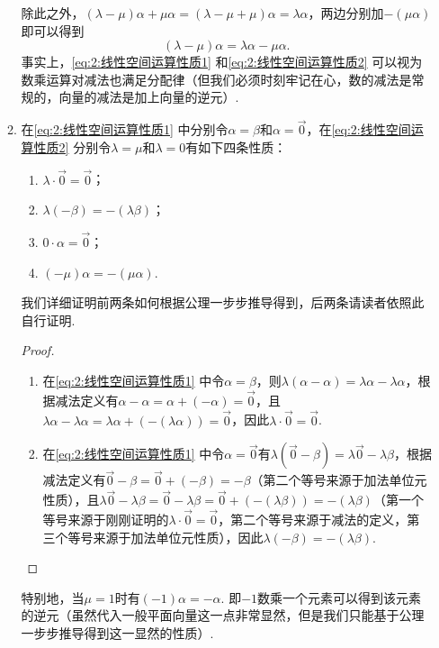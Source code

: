 \begin{enumerate}
\begin{enumerate}
                    除此之外，$(\lambda-\mu)\alpha+\mu\alpha=(\lambda-\mu+\mu)\alpha=\lambda\alpha$，两边分别加$-(\mu\alpha)$即可以得到
                    \begin{equation}\label{eq:2:线性空间运算性质2}
                        (\lambda-\mu)\alpha=\lambda\alpha-\mu\alpha.
                    \end{equation}
                    事实上，\autoref{eq:2:线性空间运算性质1} 和\autoref{eq:2:线性空间运算性质2} 可以视为数乘运算对减法也满足分配律（但我们必须时刻牢记在心，数的减法是常规的，向量的减法是加上向量的逆元）.

              \item 在\autoref{eq:2:线性空间运算性质1} 中分别令$\alpha=\beta$和$\alpha=\vec{0}$，在\autoref{eq:2:线性空间运算性质2} 分别令$\lambda=\mu$和$\lambda=0$有如下四条性质：
                    \begin{enumerate}
                        \item $\lambda\cdot \vec{0}=\vec{0}$；

                        \item $\lambda(-\beta)=-(\lambda\beta)$；

                        \item $0\cdot \alpha=\vec{0}$；

                        \item $(-\mu)\alpha=-(\mu\alpha)$.
                    \end{enumerate}
                    我们详细证明前两条如何根据公理一步步推导得到，后两条请读者依照此自行证明.
                    \begin{proof}
                        \begin{enumerate}
                            \item 在\autoref{eq:2:线性空间运算性质1} 中令$\alpha=\beta$，则$\lambda(\alpha-\alpha)=\lambda\alpha-\lambda\alpha$，根据减法定义有$\alpha-\alpha=\alpha+(-\alpha)=\vec{0}$，且$\lambda\alpha-\lambda\alpha=\lambda\alpha+(-(\lambda\alpha))=\vec{0}$，因此$\lambda\cdot \vec{0}=\vec{0}$.

                            \item 在\autoref{eq:2:线性空间运算性质1} 中令$\alpha=\vec{0}$有$\lambda(\vec{0}-\beta)=\lambda\vec{0}-\lambda\beta$，根据减法定义有$\vec{0}-\beta=\vec{0}+(-\beta)=-\beta$（第二个等号来源于加法单位元性质），且$\lambda\vec{0}-\lambda\beta=\vec{0}-\lambda\beta=\vec{0}+(-(\lambda\beta))=-(\lambda\beta)$（第一个等号来源于刚刚证明的$\lambda\cdot \vec{0}=\vec{0}$，第二个等号来源于减法的定义，第三个等号来源于加法单位元性质），因此$\lambda(-\beta)=-(\lambda\beta)$.
                        \end{enumerate}
                    \end{proof}
                    特别地，当$\mu=1$时有$(-1)\alpha=-\alpha$. 即$-1$数乘一个元素可以得到该元素的逆元（虽然代入一般平面向量这一点非常显然，但是我们只能基于公理一步步推导得到这一显然的性质）.


\end{enumerate}
\end{enumerate}
